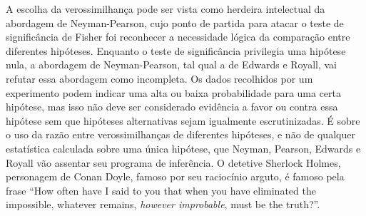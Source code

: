 A escolha da verossimilhança pode ser vista como herdeira intelectual da abordagem de Neyman-Pearson, cujo ponto de partida
para atacar o teste de significância de Fisher foi reconhecer a
necessidade lógica da comparação entre diferentes hipóteses.
Enquanto o teste de significância privilegia uma hipótese nula, a abordagem de Neyman-Pearson, tal qual a de Edwards e Royall,
vai refutar essa abordagem como incompleta. Os dados recolhidos por um experimento podem indicar uma alta ou baixa
probabilidade para uma certa hipótese, %
mas isso não deve ser considerado evidência a favor ou contra essa hipótese sem
que hipóteses alternativas sejam igualmente escrutinizadas. É sobre o uso da razão entre verossimilhanças de diferentes hipóteses,
e não de qualquer estatística calculada sobre uma única hipótese, que Neyman, Pearson, Edwards e Royall vão assentar seu
programa de inferência. O detetive Sherlock Holmes, personagem de Conan Doyle, famoso por seu raciocínio arguto, é famoso
pela frase ``How often have I said to you that when you have eliminated the impossible, whatever remains, {\em however 
improbable}, must be the truth?''.

